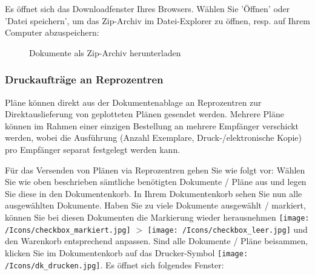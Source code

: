 \vspace{\baselineskip}

Es öffnet sich das Downloadfenster Ihres Browsers. Wählen Sie 'Öffnen' oder 'Datei speichern', um das Zip-Archiv im Datei-Explorer zu öffnen, resp. auf Ihrem Computer abzuspeichern:

\begin{figure}[H]
\caption{Dokumente als Zip-Archiv herunterladen}
\end{figure}

\subsubsection{Druckaufträge an Reprozentren}
\label{bkm:Ref20170609127}

Pläne können direkt aus der Dokumentenablage an Reprozentren zur Direktauslieferung von geplotteten Plänen gesendet werden. Mehrere Pläne können im Rahmen einer einzigen Bestellung an mehrere Empfänger verschickt werden, wobei die Ausführung (Anzahl Exemplare, Druck-/elektronische Kopie) pro Empfänger separat festgelegt werden kann.

\vspace{\baselineskip}

Für das Versenden von Plänen via Reprozentren gehen Sie wie folgt vor: Wählen Sie wie oben beschrieben sämtliche benötigten Dokumente / Pläne aus und legen Sie diese in den Dokumentenkorb. In Ihrem Dokumentenkorb sehen Sie nun alle ausgewählten Dokumente. Haben Sie zu viele Dokumente ausgewählt / markiert, können Sie bei diesen Dokumenten die Markierung wieder herausnehmen \texttt{[image: /Icons/checkbox\_markiert.jpg]} $ > $ \texttt{[image: /Icons/checkbox\_leer.jpg]} und den Warenkorb entsprechend anpassen. Sind alle Dokumente / Pläne beisammen, klicken Sie im Dokumentenkorb auf das Drucker-Symbol \texttt{[image: /Icons/dk\_drucken.jpg]}. Es öffnet sich folgendes Fenster:

